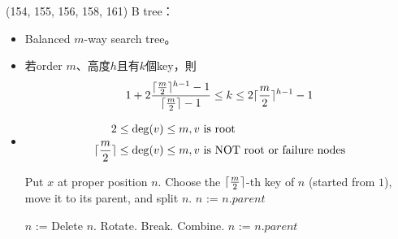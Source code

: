 \item \begin{theorem}{(154, 155, 156, 158, 161)} B tree： \label{m-wayst}\begin{itemize}
        \item Balanced $m$-way search tree。
        \item 若order $m$、高度$h$且有$k$個key，則\begin{equation}
            1 + 2\frac{\lceil\frac{m}{2}\rceil^{h - 1} - 1}{\lceil\frac{m}{2}\rceil - 1} \le k \le 2\lceil\frac{m}{2}\rceil^{h - 1} - 1
        \end{equation}
        \item \begin{equation}
            \begin{aligned}
                2 \le \deg(v) \le m &, v \ \text{is root} \\
                \lceil\frac{m}{2}\rceil \le \deg(v) \le m &, v \ \text{is NOT root or failure nodes}
            \end{aligned}
        \end{equation}
        \begin{algorithm}[H]
            \begin{algorithmic}[1]
                    \State Put $x$ at proper position $n$.
                        \State Choose the $\lceil\frac{m}{2}\rceil$-th key of $n$ (started from $1$), move it to its parent, and split $n$.
                        \State $n$ := $n.parent$
                    \EndWhile
                \EndFunction
            \end{algorithmic}
        \end{algorithm}
        \begin{algorithm}[H]
            \begin{algorithmic}[1]
                    \State $n$ := 
                        \State Delete $n$.
                                \State Rotate.
                                \State Break.
                            \Else
                                \State Combine.
                                \State $n$ := $n.parent$
                            \EndIf
                        \EndWhile
                    \Else {}

\end{algorithmic}
\end{algorithm}
\end{itemize}
\end{theorem}
